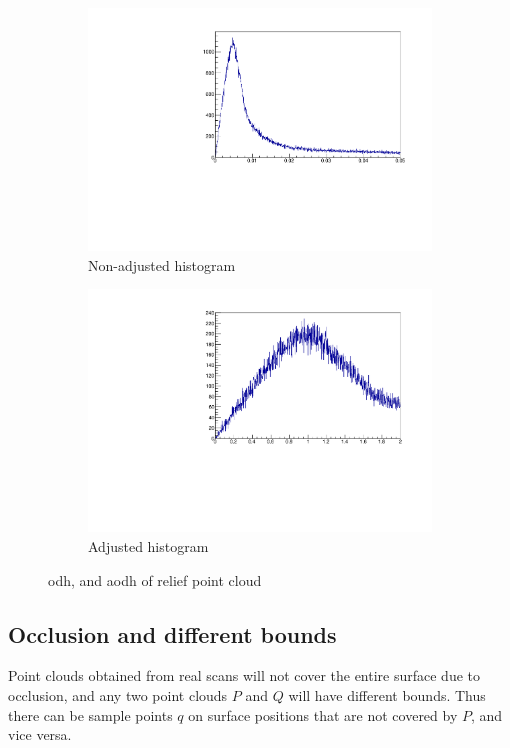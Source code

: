 \begin{figure}[p]
\begin{subfigure}{.5\textwidth}
	\includegraphics[width=\linewidth]{fig/relief_noadj.pdf}
	\caption{Non-adjusted histogram}
\end{subfigure}%
\begin{subfigure}{.5\textwidth}
	\includegraphics[width=\linewidth]{fig/relief_adj.pdf}
	\caption{Adjusted histogram}
\end{subfigure}
\caption{\Gls{odh}, and \gls{aodh} of relief point cloud}
\label{fig:relief_adj}
\end{figure}



\subsection{Occlusion and different bounds}
Point clouds obtained from real scans will not cover the entire surface due to occlusion, and any two point clouds $P$ and $Q$ will have different bounds. Thus there can be sample points $q$ on surface positions that are not covered by $P$, and vice versa.

